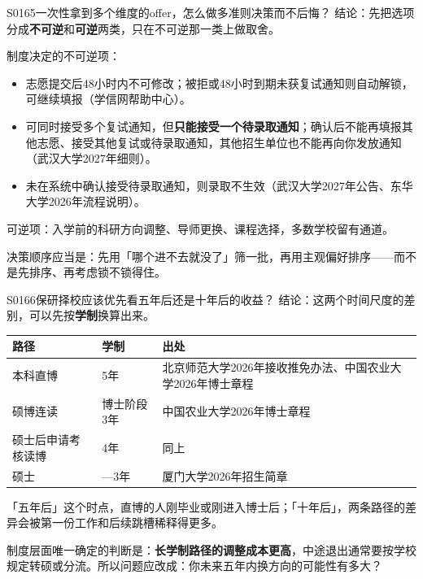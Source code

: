 \begin{qa}{S0165}{一次性拿到多个维度的offer，怎么做多准则决策而不后悔？}
结论：先把选项分成\textbf{不可逆}和\textbf{可逆}两类，只在不可逆那一类上做取舍。

制度决定的不可逆项：
\begin{itemize}
  \item 志愿提交后48小时内不可修改；被拒或48小时到期未获复试通知则自动解锁，可继续填报（学信网帮助中心）。
  \item 可同时接受多个复试通知，但\textbf{只能接受一个待录取通知}；确认后不能再填报其他志愿、接受其他复试或待录取通知，其他招生单位也不能再向你发放通知（武汉大学2027年细则）。
  \item 未在系统中确认接受待录取通知，则录取不生效（武汉大学2027年公告、东华大学2026年流程说明）。
\end{itemize}

可逆项：入学前的科研方向调整、导师更换、课程选择，多数学校留有通道。

决策顺序应当是：先用「哪个进不去就没了」筛一批，再用主观偏好排序——而不是先排序、再考虑锁不锁得住。
\end{qa}

\begin{qa}{S0166}{保研择校应该优先看五年后还是十年后的收益？}
结论：这两个时间尺度的差别，可以先按\textbf{学制}换算出来。

\par\vspace{2pt}\nobreak\begin{center}\footnotesize
\begin{tabularx}{\textwidth}{>{\raggedright\arraybackslash}X>{\raggedright\arraybackslash}X>{\raggedright\arraybackslash}X}
\toprule
\textbf{路径} & \textbf{学制} & \textbf{出处} \\ \midrule
本科直博 & 5年 & 北京师范大学2026年接收推免办法、中国农业大学2026年博士章程 \\
硕博连读 & 博士阶段3年 & 中国农业大学2026年博士章程 \\
硕士后申请考核读博 & 4年 & 同上 \\
硕士 & 2—3年 & 厦门大学2026年招生简章 \\
\bottomrule
\end{tabularx}
\end{center}\vspace{2pt}\par

「五年后」这个时点，直博的人刚毕业或刚进入博士后；「十年后」，两条路径的差异会被第一份工作和后续跳槽稀释得更多。

制度层面唯一确定的判断是：\textbf{长学制路径的调整成本更高}，中途退出通常要按学校规定转硕或分流。所以问题应改成：你未来五年内换方向的可能性有多大？
\end{qa}

